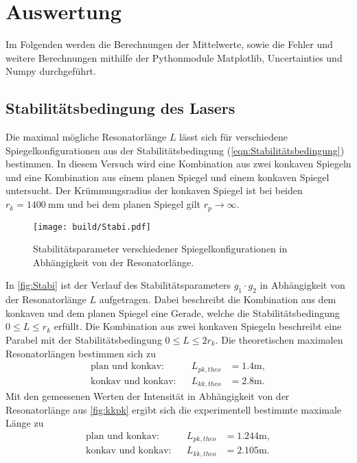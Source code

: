 \section{Auswertung}
\label{sec:Auswertung}

Im Folgenden werden die Berechnungen der Mittelwerte, sowie die Fehler und weitere Berechnungen mithilfe der Pythonmodule Matplotlib\cite{matplotlib},
Uncertainties\cite{uncertainties} und Numpy\cite{numpy} durchgeführt.

\subsection{Stabilitätsbedingung des Lasers}
\label{subsec:Stabilitätsbedingung}
Die maximal mögliche Resonatorlänge $L$ lässt sich für verschiedene Spiegelkonfigurationen aus der Stabilitätsbedingung (\autoref{eqn:Stabilitätsbedingung})
bestimmen. In diesem Versuch wird eine Kombination aus zwei konkaven Spiegeln und eine Kombination aus einem planen Spiegel und einem konkaven
Spiegel untersucht.
Der Krümmungsradius der konkaven Spiegel ist bei beiden $r_k = \qty{1400}{\milli\meter}$ und bei dem planen Spiegel gilt $r_p \to \infty$.

\begin{figure}[H]
  \centering
  \texttt{[image: build/Stabi.pdf]}
  \caption {Stabilitätsparameter verschiedener Spiegelkonfigurationen in Abhängigkeit von der Resonatorlänge.}
  \label{fig:Stabi}
\end{figure}

In \autoref{fig:Stabi} ist der Verlauf des Stabilitätsparameters $g_1 \cdot g_2$ in Abhängigkeit von der Resonatorlänge $L$ aufgetragen. Dabei beschreibt die
Kombination aus dem konkaven und dem planen Spiegel eine Gerade, welche die Stabilitätsbedingung $0 \leq L \leq r_k$ erfüllt. Die Kombination aus zwei konkaven Spiegeln
beschreibt eine Parabel mit der Stabilitätsbedingung $0 \leq L \leq 2 r_k$.
Die theoretischen maximalen Resonatorlängen bestimmen sich zu
\begin{align*}
  \text{plan und konkav:} && L_{pk,theo} &= 1.4 \si{\meter},\\
  \text{konkav und konkav:}&& L_{kk,theo} & = 2.8 \si{\meter}.
\end{align*}
Mit den gemessenen Werten der Intensität in Abhängigkeit von der Resonatorlänge aus \autoref{fig:kkpk} ergibt sich die experimentell
bestimmte maximale Länge zu
\begin{align*}
  \text{plan und konkav:} && L_{pk,theo} &= 1.244 \si{\meter},\\
  \text{konkav und konkav:}&& L_{kk,theo} & = 2.105 \si{\meter}.
\end{align*}


